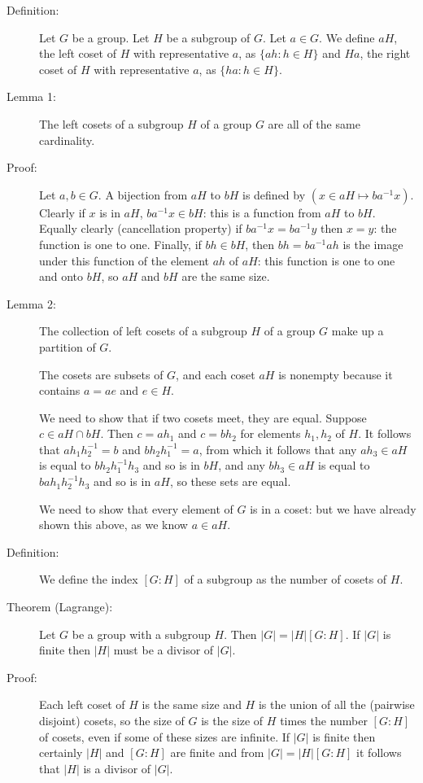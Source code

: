 \documentclass[12pt]{article}
\begin{document}
\begin{description}

\item[Definition:]  Let $G$ be  a group.  Let $H$ be a subgroup of $G$.  Let $a \in G$.  We define $aH$, the left coset of $H$ with representative $a$, as $\{ah:h \in H\}$ and $Ha$, the right coset of $H$ with representative $a$,
as $\{ha:h \in H\}$.

\item[Lemma 1:]  The left cosets of a subgroup $H$ of a group $G$ are all of the same cardinality.

\item[Proof:]  Let $a,b \in G$.  A bijection from $aH$ to $bH$ is defined by $(x \in aH\mapsto ba^{-1}x)$.  Clearly if $x$ is in $aH$, $ba^{-1}x \in bH$:  this is a function from $aH$ to $bH$.  Equally clearly (cancellation property)
if $ba^{-1}x = ba^{-1}y$ then $x=y$:  the function is one to one.  Finally, if $bh \in bH$, then $bh = ba^{-1}ah$ is the image under this function of the element $ah$ of $aH$:  this function is one to one and onto $bH$, so $aH$ and $bH$ are the same size.

\item[Lemma 2:]  The collection of left cosets of a subgroup $H$ of a group $G$ make up a partition of $G$.

The cosets are subsets of $G$, and each coset $aH$ is nonempty because it contains $a=ae$ and $e \in H$.

We need to show that if two cosets meet, they are equal.  Suppose $c \in aH \cap bH$.  Then $c=ah_1$ and $c = bh_2$ for elements
$h_1,h_2$ of $H$.  It follows that $ah_1h_2^{-1} = b$ and $bh_2h_1^{-1}=a$, from which it follows that any $ah_3 \in aH$ is equal to $bh_2h_1^{-1}h_3$ and so is in $bH$,
and any $bh_3 \in aH$ is equal to $bah_1h_2^{-1}h_3$ and so is in $aH$, so these sets are equal.

We need to show that every element of $G$ is in a coset:  but we have already shown this above, as we know $a \in aH$.

\item[Definition:]  We define the index $[G:H]$ of a subgroup as the number of cosets of $H$.

\item[Theorem (Lagrange):]  Let $G$ be a group with a subgroup $H$.  Then $|G| = |H|[G:H]$.  If $|G|$ is finite then $|H|$ must be a divisor of $|G|$.

\item[Proof:]  Each left coset of $H$ is the same size and $H$ is the union of all the (pairwise disjoint) cosets, so the size of $G$ is the size of $H$ times the number $[G:H]$ of cosets, even if some of
these sizes are infinite.  If $|G|$ is finite then certainly $|H|$ and $[G:H]$ are finite and from $|G|=|H|[G:H]$ it follows that $|H|$ is a divisor of $|G|$.


\end{description}
\end{document}
